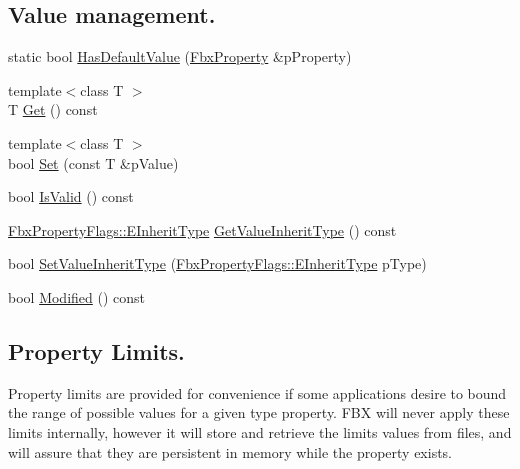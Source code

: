 \subsection*{Value management.}
\begin{DoxyCompactItemize}
\item 
static bool \hyperlink{class_fbx_property_aa040d85cda5816e4937a348e47357a61}{Has\+Default\+Value} (\hyperlink{class_fbx_property}{Fbx\+Property} \&p\+Property)
\item 
{\footnotesize template$<$class T $>$ }\\T \hyperlink{class_fbx_property_a7d3760c0aec45b51823c57f62a08dc46}{Get} () const
\item 
{\footnotesize template$<$class T $>$ }\\bool \hyperlink{class_fbx_property_a7854464326c74ce7caee2a4263284a46}{Set} (const T \&p\+Value)
\item 
bool \hyperlink{class_fbx_property_a1c40042c55d1f4a1d4837f06fbc1d764}{Is\+Valid} () const
\item 
\hyperlink{class_fbx_property_flags_ae3b667a4fcac4b827fa186a698fec2f8}{Fbx\+Property\+Flags\+::\+E\+Inherit\+Type} \hyperlink{class_fbx_property_aee557d7603e73430d4034a03b631b75e}{Get\+Value\+Inherit\+Type} () const
\item 
bool \hyperlink{class_fbx_property_ad83cb36df88b5c088d955effd462d4be}{Set\+Value\+Inherit\+Type} (\hyperlink{class_fbx_property_flags_ae3b667a4fcac4b827fa186a698fec2f8}{Fbx\+Property\+Flags\+::\+E\+Inherit\+Type} p\+Type)
\item 
bool \hyperlink{class_fbx_property_acea8ef5412320c293dfaca9680bc797b}{Modified} () const
\end{DoxyCompactItemize}
\subsection*{Property Limits.}
\label{_amgrp3eae9aa97a3e75e6a8fba4877593ea02}%
Property limits are provided for convenience if some applications desire to bound the range of possible values for a given type property. F\+BX will never apply these limits internally, however it will store and retrieve the limits values from files, and will assure that they are persistent in memory while the property exists.


